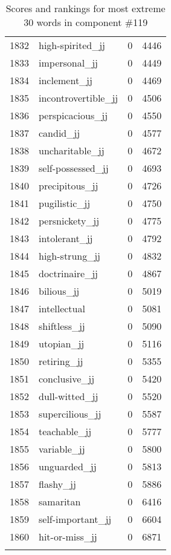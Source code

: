 \begin{longtable}[!htbp]{| rlr@{.}l |}
    1832 & high-spirited\_jj & 0 & 4446 \\
    1833 & impersonal\_jj & 0 & 4449 \\
    1834 & inclement\_jj & 0 & 4469 \\
    1835 & incontrovertible\_jj & 0 & 4506 \\
    1836 & perspicacious\_jj & 0 & 4550 \\
    1837 & candid\_jj & 0 & 4577 \\
    1838 & uncharitable\_jj & 0 & 4672 \\
    1839 & self-possessed\_jj & 0 & 4693 \\
    1840 & precipitous\_jj & 0 & 4726 \\
    1841 & pugilistic\_jj & 0 & 4750 \\
    1842 & persnickety\_jj & 0 & 4775 \\
    1843 & intolerant\_jj & 0 & 4792 \\
    1844 & high-strung\_jj & 0 & 4832 \\
    1845 & doctrinaire\_jj & 0 & 4867 \\
    1846 & bilious\_jj & 0 & 5019 \\
    1847 & intellectual & 0 & 5081 \\
    1848 & shiftless\_jj & 0 & 5090 \\
    1849 & utopian\_jj & 0 & 5116 \\
    1850 & retiring\_jj & 0 & 5355 \\
    1851 & conclusive\_jj & 0 & 5420 \\
    1852 & dull-witted\_jj & 0 & 5520 \\
    1853 & supercilious\_jj & 0 & 5587 \\
    1854 & teachable\_jj & 0 & 5777 \\
    1855 & variable\_jj & 0 & 5800 \\
    1856 & unguarded\_jj & 0 & 5813 \\
    1857 & flashy\_jj & 0 & 5886 \\
    1858 & samaritan & 0 & 6416 \\
    1859 & self-important\_jj & 0 & 6604 \\
    1860 & hit-or-miss\_jj & 0 & 6871 \\
    \hline
    \caption{Scores and rankings for most extreme 30 words in component \#119} \\
\end{longtable}
